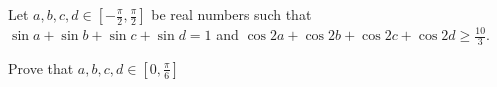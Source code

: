 Let $a,b,c,d \in [-\frac{\pi}{2}, \frac{\pi}{2}]$ be real numbers such that$\sin{a}+\sin{b}+\sin{c}+\sin{d}=1$ and $\cos{2a}+\cos{2b}+\cos{2c}+\cos{2d}\geq \frac{10}{3}$.

Prove that $a,b,c,d \in [0, \frac{\pi}{6}]$